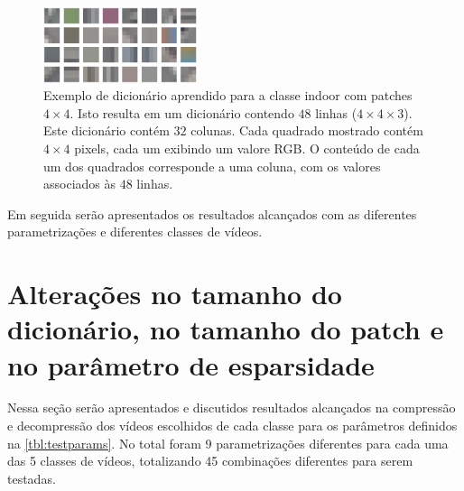 \documentclass[cic,tc]{iiufrgs}
\begin{document}
\begin{figure}[H]
    \caption{Exemplo de dicionário aprendido para a classe indoor com patches $4\times4$. 
    Isto resulta em um dicionário contendo $48$ linhas ($4\times4\times3$). 
    Este dicionário contém $32$ colunas. 
    Cada quadrado mostrado contém $4\times4$ pixels, 
    cada um exibindo um valore RGB.
    O conteúdo de cada um dos quadrados corresponde a uma coluna, com os valores 
    associados às $48$ linhas.}
    \begin{center}
           \includegraphics[width=0.4\textwidth]{img/indoor_p4_d32.png}
    \end{center}
    \label{fig:dicip4d32}
\end{figure}


Em seguida serão apresentados os resultados alcançados com as diferentes parametrizações 
e diferentes classes de vídeos.

\section{Alterações no tamanho do dicionário, no tamanho do patch e no parâmetro de esparsidade}
\label{sec:parametrizacao}
Nessa seção serão apresentados e discutidos resultados alcançados na compressão e 
decompressão dos vídeos escolhidos de cada classe para os parâmetros definidos na 
\autoref{tbl:testparams}.
No total foram 9 parametrizações diferentes para cada uma das 5 classes de vídeos, 
totalizando 45 combinações diferentes para serem testadas.
\end{document}
